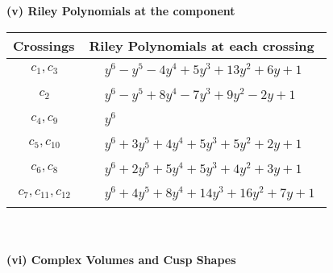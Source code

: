\documentclass[1p]{elsarticle_modified}
\theoremstyle{definition}
\begin{document}
\newpage\renewcommand{\arraystretch}{1}
\flushleft \textbf{(v) Riley Polynomials at the component}\newline \\
\begin{tabular}{m{50pt}|m{274pt}}
Crossings & \hspace{64pt}Riley Polynomials at each crossing \\
\hline $$\begin{aligned}c_{1},c_{3}\end{aligned}$$&$\begin{aligned}
&y^6- y^5-4 y^4+5 y^3+13 y^2+6 y+1
\end{aligned}$\\
\hline $$\begin{aligned}c_{2}\end{aligned}$$&$\begin{aligned}
&y^6- y^5+8 y^4-7 y^3+9 y^2-2 y+1
\end{aligned}$\\
\hline $$\begin{aligned}c_{4},c_{9}\end{aligned}$$&$\begin{aligned}
&y^6
\end{aligned}$\\
\hline $$\begin{aligned}c_{5},c_{10}\end{aligned}$$&$\begin{aligned}
&y^6+3 y^5+4 y^4+5 y^3+5 y^2+2 y+1
\end{aligned}$\\
\hline $$\begin{aligned}c_{6},c_{8}\end{aligned}$$&$\begin{aligned}
&y^6+2 y^5+5 y^4+5 y^3+4 y^2+3 y+1
\end{aligned}$\\
\hline $$\begin{aligned}c_{7},c_{11},c_{12}\end{aligned}$$&$\begin{aligned}
&y^6+4 y^5+8 y^4+14 y^3+16 y^2+7 y+1
\end{aligned}$\\
\hline
\end{tabular}\\~\\
\newpage\flushleft \textbf{(vi) Complex Volumes and Cusp Shapes}
\end{document}
